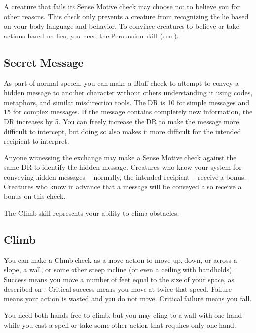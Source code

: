         A creature that fails its Sense Motive check may choose not to believe you for other reasons.
        This check only prevents a creature from recognizing the lie based on your body language and behavior.
        To convince creatures to believe or take actions based on lies, you need the Persuasion skill (see ).

    \subsection{Secret Message}
        As part of normal speech, you can make a Bluff check to attempt to convey a hidden message to another character without others understanding it using codes, metaphors, and similar misdirection tools. The DR is 10 for simple messages and 15 for complex messages. If the message contains completely new information, the DR increases by 5. You can freely increase the DR to make the message more difficult to intercept, but doing so also makes it more difficult for the intended recipient to interpret.

        Anyone witnessing the exchange may make a Sense Motive check against the same DR to identify the hidden message.
        Creatures who know your system for conveying hidden messages -- normally, the intended recipient -- receive a  bonus.
        Creatures who know in advance that a message will be conveyed also receive a  bonus on this check.

\newpage
{}
    The Climb skill represents your ability to climb obstacles.

    \subsection{Climb}
        You can make a Climb check as a move action to move up, down, or across a slope, a wall, or some other steep incline (or even a ceiling with handholds). Success means you move a number of feet equal to the size of your space, as described on . Critical success means you move at twice that speed. Failure means your action is wasted and you do not move. Critical failure means you fall.

        You need both hands free to climb, but you may cling to a wall with one hand while you cast a spell or take some other action that requires only one hand.

